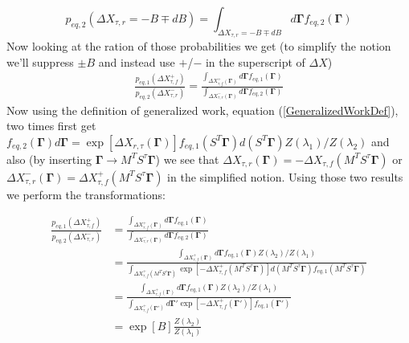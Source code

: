 \documentclass[a4paper,12pt,nofootinbib]{article}
\begin{document}
\begin{equation}
  p_{eq,2}(\Delta X_{\tau,r}=-B\mp dB) = \int_{\Delta X_{\tau,r}=-B\mp dB} d\bm{\Gamma} f_{eq,2}(\bm{\Gamma})
\end{equation}
Now looking at the ration of those probabilities we get (to simplify the notion we'll suppress $\pm B$ and instead use $+$/$-$ in the superscript of $\Delta X$)
\begin{equation}
\begin{aligned}
  \frac{p_{eq,1}(\Delta X_{\tau,f}^+)}{p_{eq,2}(\Delta X_{\tau,r}^-)}
= \frac{\int_{\Delta X_{\tau,f}^+(\bm{\Gamma})} d\bm{\Gamma} f_{eq,1}(\bm{\Gamma})}{\int_{\Delta X_{\tau,r}^-(\bm{\Gamma})} d\bm{\Gamma} f_{eq,2}(\bm{\Gamma})}
\end{aligned}
\end{equation}
Now using the definition of generalized work, equation (\ref{GeneralizedWorkDef}), two times first get $f_{eq,2}(\bm{\Gamma})d\bm{\Gamma}= \exp[\Delta X_{r,\tau}(\bm{\Gamma})] f_{eq,1}(S^T \bm{\Gamma}) d(S^T \bm{\Gamma}) Z(\lambda_1)/Z(\lambda_2) $ and also (by inserting $\bm{\Gamma} \to M^T S^{\tau} \bm{\Gamma}$) we see that $\Delta X_{\tau,r}(\bm{\Gamma}) = -\Delta X_{\tau,f}(M^T S^{\tau} \bm{\Gamma}) $ or $\Delta X_{\tau,r}^-(\bm{\Gamma}) = \Delta X_{\tau,f}^+(M^T S^{\tau} \bm{\Gamma}) $ in the simplified notion. Using those two results we perform the transformations:

\begin{equation}
\begin{aligned}
\frac{p_{eq,1}(\Delta X_{\tau,f}^+)}{p_{eq,2}(\Delta X_{\tau,r}^-)}
&=\frac{\int_{\Delta X_{\tau,f}^+(\bm{\Gamma})} d\bm{\Gamma} f_{eq,1}(\bm{\Gamma})}{\int_{\Delta X_{\tau,r}^-(\bm{\Gamma})} d\bm{\Gamma} f_{eq,2}(\bm{\Gamma})} \\
&= \frac{\int_{\Delta X_{\tau,f}^+(\bm{\Gamma})} d\bm{\Gamma} f_{eq,1}(\bm{\Gamma})Z(\lambda_2)/Z(\lambda_1)}{\int_{\Delta X_{\tau,f}^+(M^T S^{\tau}\bm{\Gamma})} \exp[-\Delta X_{\tau,f}^+(M^T S^{\tau}\bm{\Gamma})] d(M^T S^{\tau}\bm{\Gamma}) f_{eq,1}(M^T S^{\tau}\bm{\Gamma})} \\
&=\frac{\int_{\Delta X_{\tau,f}^+(\bm{\Gamma})} d\bm{\Gamma} f_{eq,1}(\bm{\Gamma}) Z(\lambda_2)/Z(\lambda_1)}{\int_{\Delta X_{\tau,f}^+(\bm{\Gamma}')} d\bm{\Gamma}' \exp[-\Delta X_{\tau,f}^+(\bm{\Gamma}')] f_{eq,1}(\bm{\Gamma}')} \\
&= \exp[B] \frac{Z(\lambda_2)}{Z(\lambda_1)}
\end{aligned}
\end{equation}
\end{document}
